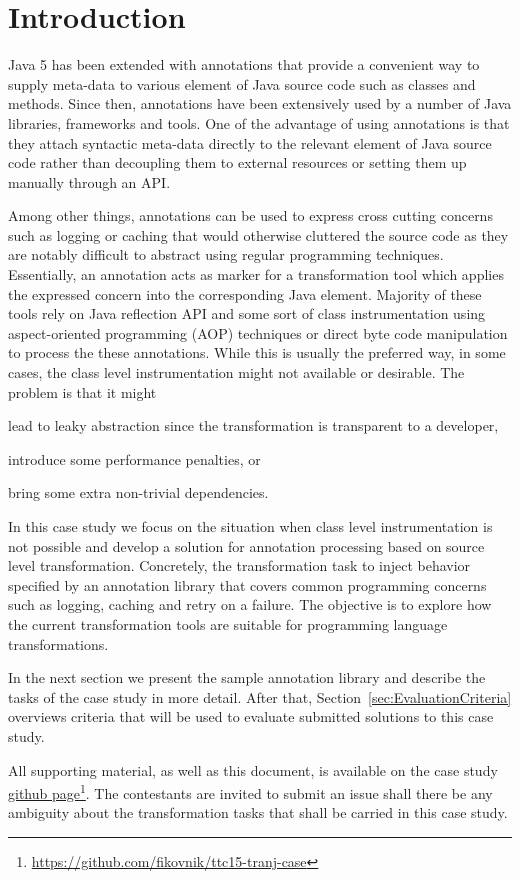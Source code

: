 
\section{Introduction}
\label{sec:Introduction}

Java 5 has been extended with annotations that provide a convenient way to supply meta-data to various element of Java source code such as classes and methods.
Since then, annotations have been extensively used by a number of Java libraries, frameworks and tools.
One of the advantage of using annotations is that they attach syntactic meta-data directly to the relevant element of Java source code rather than decoupling them to external resources or setting them up manually through an API.

Among other things, annotations can be used to express cross cutting concerns such as logging or caching that would otherwise cluttered the source code as they are notably difficult to abstract using regular programming techniques.
Essentially, an annotation acts as marker for a transformation tool which applies the expressed concern into the corresponding Java element.
Majority of these tools rely on Java reflection API and some sort of class instrumentation using aspect-oriented programming (AOP) techniques or direct byte code manipulation to process the these annotations.
While this is usually the preferred way, in some cases, the class level instrumentation might not available or desirable.
The problem is that it might 
%
\begin{inparaenum}[(i)]
\item lead to leaky abstraction since the transformation is transparent to a developer,
\item introduce some performance penalties, or
\item bring some extra non-trivial dependencies.
\end{inparaenum}

In this case study we focus on the situation when class level instrumentation is not possible and develop a solution for annotation processing based on source level transformation.
Concretely, the transformation task to inject behavior specified by an annotation library that covers common programming concerns such as logging, caching and retry on a failure.
The objective is to explore how the current transformation tools are suitable for programming language transformations.

In the next section we present the sample annotation library and describe the tasks of the case study in more detail.
After that, Section~\ref{sec:EvaluationCriteria} overviews criteria that will be used to evaluate submitted solutions to this case study.

All supporting material, as well as this document, is available on the case study \href{https://github.com/fikovnik/ttc15-tranj-case}{github page}\footnote{\url{https://github.com/fikovnik/ttc15-tranj-case}}.
The contestants are invited to submit an issue shall there be any ambiguity about the transformation tasks that shall be carried in this case study.


